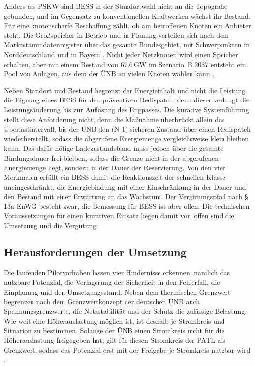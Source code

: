 Anders als \ac{PSKW} sind \ac{BESS} in der Standortwahl nicht an die Topografie gebunden, und im Gegensatz zu konventionellen Kraftwerken wächst ihr Bestand.
Für eine knotenscharfe Beschaffung zählt, ob am betroffenen Knoten ein Anbieter steht.
Die Großspeicher in Betrieb und in Planung verteilen sich nach dem Marktstammdatenregister über das gesamte Bundesgebiet, mit Schwerpunkten in Norddeutschland und in Bayern \cite{isea_batterycharts_2026}.
Nicht jeder Netzknoten wird einen Speicher erhalten, aber mit einem Bestand von 67,6\,\si{GW} im Szenario~B 2037 entsteht ein Pool von Anlagen, aus dem der \ac{ÜNB} an vielen Knoten wählen kann \cite{bundesnetzagentur_netzentwicklungsplan_2026}.

Neben Standort und Bestand begrenzt der Energieinhalt und nicht die Leistung die Eignung eines \ac{BESS} für den präventiven Redispatch, denn dieser verlangt die Leistungsänderung bis zur Auflösung des Engpasses.
Die kurative Systemführung stellt diese Anforderung nicht, denn die Maßnahme überbrückt allein das Überlastintervall, bis der \ac{ÜNB} den (N-1)-sicheren Zustand über einen Redispatch wiederherstellt, sodass die abgerufene Energiemenge vergleichsweise klein bleiben kann.
Das dafür nötige Ladezustandsband muss jedoch über die gesamte Bindungsdauer frei bleiben, sodass die Grenze nicht in der abgerufenen Energiemenge liegt, sondern in der Dauer der Reservierung.
Von den vier Merkmalen erfüllt ein \ac{BESS} damit die Reaktionszeit der schnellen Klasse uneingeschränkt, die Energiebindung mit einer Einschränkung in der Dauer und den Bestand mit einer Erwartung an das Wachstum.
Der Vergütungspfad nach §\,13a \ac{EnWG} besteht zwar, die Bemessung für \ac{BESS} ist aber offen.
Die technischen Voraussetzungen für einen kurativen Einsatz liegen damit vor, offen sind die Umsetzung und die Vergütung.

\subsection{Herausforderungen der Umsetzung}
\label{sec:challenges}

Die laufenden Pilotvorhaben lassen vier Hindernisse erkennen, nämlich das nutzbare Potenzial, die Verlagerung der Sicherheit in den Fehlerfall, die Einplanung und den Umsetzungsstand.
Neben dem thermischen Grenzwert begrenzen nach dem Grenzwertkonzept der deutschen \ac{ÜNB} auch Spannungsgrenzwerte, die Netzstabilität und der Schutz die zulässige Belastung.
Wie weit eine Höherauslastung möglich ist, ist deshalb je Stromkreis und Situation zu bestimmen.
Solange der \ac{ÜNB} einen Stromkreis nicht für die Höherauslastung freigegeben hat, gilt für diesen Stromkreis der \ac{PATL} als Grenzwert, sodass das Potenzial erst mit der Freigabe je Stromkreis nutzbar wird \cite{uenb_grenzwertkonzept_2021}.

